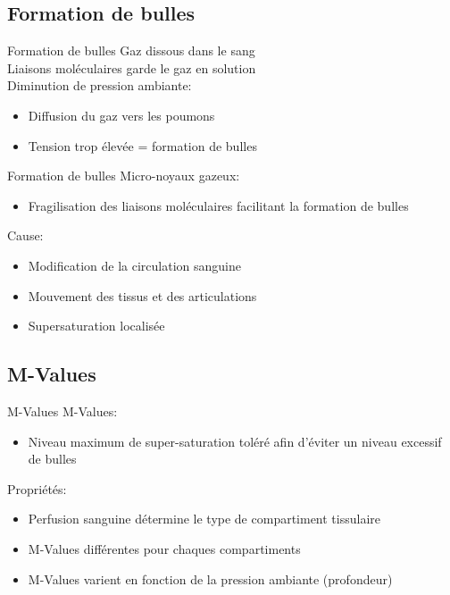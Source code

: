 \subsection{Formation de bulles}

\begin{frame}{Formation de bulles}  
	Gaz dissous dans le sang\\
	Liaisons moléculaires garde le gaz en solution\\
	Diminution de pression ambiante:
	\begin{itemize}
		\item Diffusion du gaz vers les poumons
		\item Tension trop élevée = formation de bulles
	\end{itemize}
\end{frame}

\begin{frame}{Formation de bulles}
	Micro-noyaux gazeux:
	\begin{itemize}
		\item Fragilisation des liaisons moléculaires facilitant la formation de bulles
	\end{itemize}
	\vfill
	Cause:
	\begin{itemize}
		\item Modification de la circulation sanguine
		\item Mouvement des tissus et des articulations
		\item Supersaturation localisée
	\end{itemize}
\end{frame}

\subsection{M-Values}

\begin{frame}{M-Values}  
	M-Values:
	\begin{itemize}
		\item Niveau maximum de super-saturation toléré afin d'éviter un niveau excessif de bulles
	\end{itemize}
	\vfill
	Propriétés:
	\begin{itemize}
		\item Perfusion sanguine détermine le type de compartiment tissulaire
		\item M-Values différentes pour chaques compartiments
		\item M-Values varient en fonction de la pression ambiante (profondeur)
	\end{itemize}
\end{frame}

